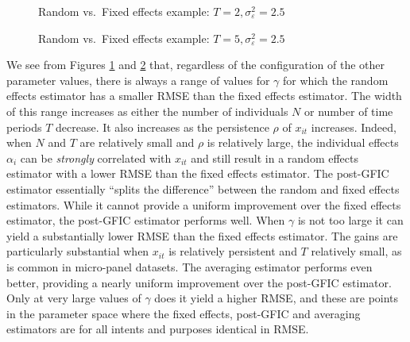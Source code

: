 \begin{figure}[h]
  \centering
  
  \caption{Random vs.\ Fixed effects example: $T=2, \sigma_{\varepsilon}^2 = 2.5$}
  \label{fig:REvsFE_T2}
\end{figure}

\begin{figure}[h]
  \centering
  
  \caption{Random vs.\ Fixed effects example: $T=5, \sigma_{\varepsilon}^2 = 2.5$}
  \label{fig:REvsFE_T5}
\end{figure}

We see from Figures \ref{fig:REvsFE_T2} and \ref{fig:REvsFE_T5} that, regardless of the configuration of the other parameter values, there is always a range of values for $\gamma$ for which the random effects estimator has a smaller RMSE than the fixed effects estimator.
The width of this range increases as either the number of individuals $N$ or number of time periods $T$ decrease.
It also increases as the persistence $\rho$ of $x_{it}$ increases.
Indeed, when $N$ and $T$ are relatively small and $\rho$ is relatively large, the individual effects $\alpha_{i}$ can be \emph{strongly} correlated with $x_{it}$ and still result in a random effects estimator with a lower RMSE than the fixed effects estimator. 
The post-GFIC estimator essentially ``splits the difference'' between the random and fixed effects estimators.
While it cannot provide a uniform improvement over the fixed effects estimator, the post-GFIC estimator performs well.
When $\gamma$ is not too large it can yield a substantially lower RMSE than the fixed effects estimator.
The gains are particularly substantial when $x_{it}$ is relatively persistent and $T$ relatively small, as is common in micro-panel datasets.
The averaging estimator performs even better, providing a nearly uniform improvement over the post-GFIC estimator.
Only at very large values of $\gamma$ does it yield a higher RMSE, and these are points in the parameter space where the fixed effects, post-GFIC and averaging estimators are for all intents and purposes identical in RMSE.


